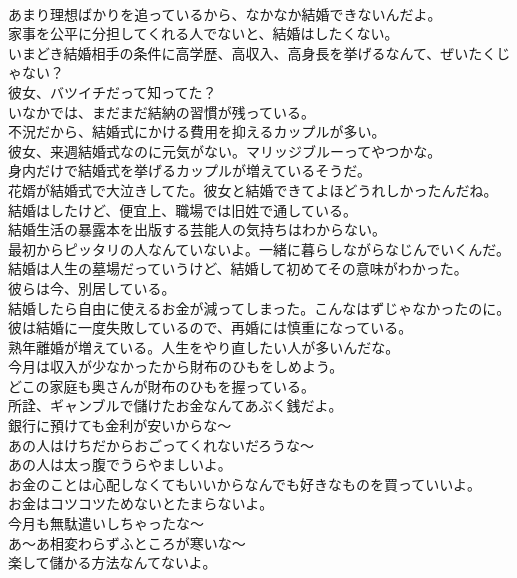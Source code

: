\documentclass[8pt]{extreport}
\begin{document}
\begin{CJK}{UTF8}{min}
\\	あまり理想ばかりを追っているから、なかなか結婚できないんだよ。	
\\	家事を公平に分担してくれる人でないと、結婚はしたくない。	
\\	いまどき結婚相手の条件に高学歴、高収入、高身長を挙げるなんて、ぜいたくじゃない？	
\\	彼女、バツイチだって知ってた？	
\\	いなかでは、まだまだ結納の習慣が残っている。	
\\	不況だから、結婚式にかける費用を抑えるカップルが多い。	
\\	彼女、来週結婚式なのに元気がない。マリッジブルーってやつかな。	
\\	身内だけで結婚式を挙げるカップルが増えているそうだ。	
\\	花婿が結婚式で大泣きしてた。彼女と結婚できてよほどうれしかったんだね。	
\\	結婚はしたけど、便宜上、職場では旧姓で通している。	
\\	結婚生活の暴露本を出版する芸能人の気持ちはわからない。	
\\	最初からピッタリの人なんていないよ。一緒に暮らしながらなじんでいくんだ。	
\\	結婚は人生の墓場だっていうけど、結婚して初めてその意味がわかった。	
\\	彼らは今、別居している。	
\\	結婚したら自由に使えるお金が減ってしまった。こんなはずじゃなかったのに。	
\\	彼は結婚に一度失敗しているので、再婚には慎重になっている。	
\\	熟年離婚が増えている。人生をやり直したい人が多いんだな。	
\\	今月は収入が少なかったから財布のひもをしめよう。	
\\	どこの家庭も奥さんが財布のひもを握っている。	
\\	所詮、ギャンブルで儲けたお金なんてあぶく銭だよ。	
\\	銀行に預けても金利が安いからな～	
\\	あの人はけちだからおごってくれないだろうな～	
\\	あの人は太っ腹でうらやましいよ。	
\\	お金のことは心配しなくてもいいからなんでも好きなものを買っていいよ。	
\\	お金はコツコツためないとたまらないよ。	
\\	今月も無駄遣いしちゃったな～	
\\	あ～あ相変わらずふところが寒いな～	
\\	楽して儲かる方法なんてないよ。	

\end{CJK}
\end{document}
